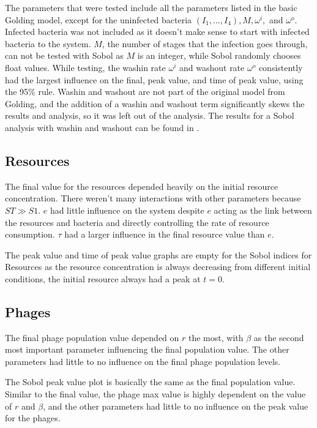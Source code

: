 The parameters that were tested include all the parameters listed in the basic Golding model, except for the uninfected bacteria $(I_1, \dots, I_4), M, \omega^i,$ and $\omega^o$. 
Infected bacteria was not included as it doesn't make sense to start with infected bacteria to the system. 
$M$, the number of stages that the infection goes through, can not be tested with Sobol as $M$ is an integer, while Sobol randomly chooses float values. 
While testing, the washin rate $\omega^i$ and washout rate $\omega^o$ consistently had the largest influence on the final, peak value, and time of peak value, using the 95\% rule. 
Washin and washout are not part of the original model from Golding, and the addition of a washin and washout term significantly skews the results and analysis, so it was left out of the analysis. 
The results for a Sobol analysis with washin and washout can be found in . 

\subsection{Resources}
The final value for the resources depended heavily on the initial resource concentration. 
There weren't many interactions with other parameters because $ST \gg S1$. 
$e$ had little influence on the system despite $e$ acting as the link between the resources and bacteria and directly controlling the rate of resource consumption. 
$\tau$ had a larger influence in the final resource value than $e$. 

The peak value and time of peak value graphs are empty for the Sobol indices for Resources as the resource concentration is always decreasing from different initial conditions, the initial resource always had a peak at $t=0$. 

\subsection{Phages}
The final phage population value depended on $r$ the most, with $\beta$ as the second most important parameter influencing the final population value. 
The other parameters had little to no influence on the final phage population levels. 

The Sobol peak value plot is basically the same as the final population value. 
Similar to the final value, the phage max value is highly dependent on the value of $r$ and $\beta$, and the other parameters had little to no influence on the peak value for the phages. 

